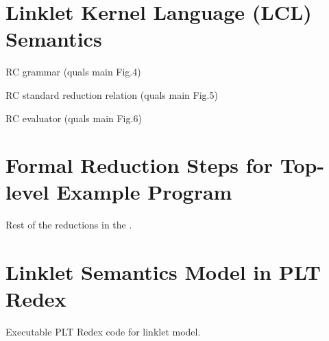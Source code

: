 \begin{appendices}



\chapter[\texorpdfstring{Linklet Kernel Language (LKL) Semantics}{Appendix A}]{Linklet Kernel Language (LCL) Semantics}
\label{appendix:linklet-kernel-language}

    \begin{figure-here}
        RC grammar (quals main Fig.4)
    \end{figure-here}

    \begin{figure-here}
        RC standard reduction relation (quals main Fig.5)
    \end{figure-here}

    \begin{figure-here}
        RC evaluator (quals main Fig.6)
    \end{figure-here}


\chapter[\texorpdfstring{Formal Reduction Steps for Top-level Example Program}{Appendix B}]{Formal Reduction Steps for Top-level Example Program}
\label{appendix:formal-reduction-steps-toplevel-example}

    \begin{figure-here}
        Rest of the reductions in the .
    \end{figure-here}

\chapter[\texorpdfstring{Linklet Semantics Model in PLT Redex}{Appendix C}]{Linklet Semantics Model in PLT Redex}
\label{appendix:linklet-semantics-model-redex-code}

    \begin{figure-here}
        Executable PLT Redex code for linklet model.
    \end{figure-here}


\end{appendices}
